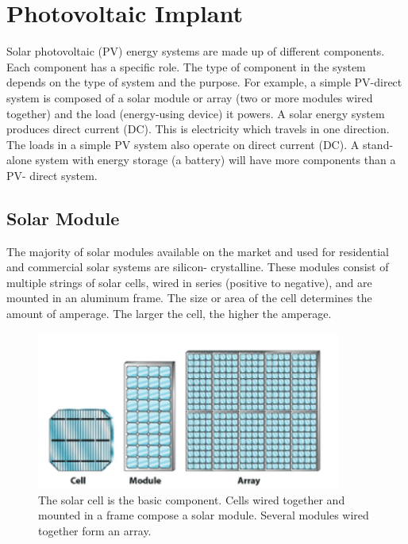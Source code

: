 \section{Photovoltaic Implant}

Solar photovoltaic (PV) energy systems are made up of
different components. Each component has a specific role.
The type of component in the system depends on the type
of system and the purpose. For example, a simple PV-direct
system is composed of a solar module or array (two or more
modules wired together) and the load (energy-using device)
it powers. A solar energy system produces
direct current (DC). This is electricity which travels in one
direction. The loads in a simple PV system also operate
on direct current (DC). A stand-alone system with energy
storage (a battery) will have more components than a PV-
direct system.

\subsection{Solar Module}
The majority of solar modules available on the market and
used for residential and commercial solar systems are silicon-
crystalline. These modules consist of multiple strings of solar
cells, wired in series (positive to negative), and are mounted
in an aluminum frame. The size or area of
the cell determines the amount of amperage. The larger the
cell, the higher the amperage.

\begin{figure}[H]
    \centering
    \includegraphics[width=10cm, keepaspectratio]{chapters/1_introduction/imgs/solarmodule.png}
    \caption{The solar cell is the basic component. Cells wired together
and mounted in a frame compose a solar module. Several modules
wired together form an array.}
    \label{fig:solmodule}
\end{figure}

